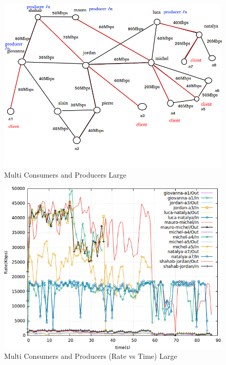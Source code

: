 \begin{figure}[H]

\begin{center}


\includegraphics[scale = 0.5]{Figures/Multi-Repo-Client.png}

\caption{Multi Consumers and Producers Large} \label{Multi-Repo-Client} 


\end{center}

\end{figure}




\begin{figure}[H]

\begin{center}


\includegraphics[scale = 0.4]{Figures/multi-repo-client.png}

\caption{Multi Consumers and Producers (Rate vs Time) Large} \label{multi-repo-client} 


\end{center}

\end{figure}


